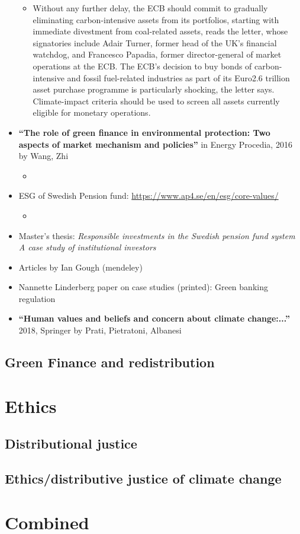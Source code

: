 \documentclass{article}
\begin{document}
\begin{itemize}
\begin{itemize}
	\item Without any further delay, the ECB should commit to gradually eliminating carbon-intensive assets from its portfolios, starting with immediate divestment from coal-related assets, reads the letter, whose signatories include Adair Turner, former head of the UK's financial watchdog, and Francesco Papadia, former director-general of market operations at the ECB.
	The ECB's decision to buy bonds of carbon-intensive and fossil fuel-related industries as part of its Euro2.6 trillion asset purchase programme is particularly shocking, the letter says. Climate-impact criteria should be used to screen all assets currently eligible for monetary operations.
	
\end{itemize}
\item \textbf{``The role of green finance in environmental protection: Two aspects of market mechanism and policies''} in Energy Procedia, 2016  by Wang, Zhi
\begin{itemize}
	\item 
\end{itemize}

\item  ESG of Swedish Pension fund: \url{https://www.ap4.se/en/esg/core-values/}
\begin{itemize}
\item 	
\end{itemize}
\item Master's thesis: \textit{Responsible investments in the Swedish pension fund system
A case study of institutional investors}
\item Articles by Ian Gough (mendeley)
\item Nannette Linderberg paper on case studies (printed): Green banking regulation
\item \textbf{``Human values and beliefs and concern about climate change:...''} 2018, Springer by Prati, Pietratoni, Albanesi
\end{itemize}
\subsection{Green Finance and redistribution}
\section{Ethics}
\subsection{Distributional justice}
\subsection{Ethics/distributive justice of climate change}
\section{Combined}
	
	\newpage
	
	
	
\end{document}
